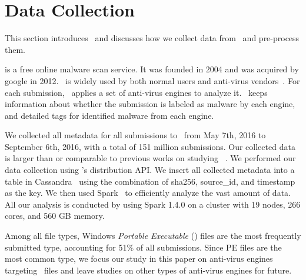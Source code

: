 \section{Data Collection}
\label{sec:meth}

This section introduces \vt\ and 
discusses how we collect data from \vt\ and pre-process them.

\noindent{\underline{\textit{\vt}}}
is a free online malware scan service.
It was founded in 2004 and was acquired by google in 2012. 
\vt\ is widely used by both normal users and anti-virus vendors~\cite{huangvt2016bigdata, neeles}. 
For each submission, \vt\ applies a set of anti-virus engines to analyze it. 
\vt\ keeps information about whether the submission is labeled as malware by each engine, 
and detailed tags for identified malware from each engine. 


We collected all metadata for all submissions to \vt\ from May 7th, 2016 to September 6th, 2016,
with a total of 151 million submissions. 
Our collected data is larger than or comparable to previous works on studying \vt~\cite{SongAPsys2016,huangvt2016bigdata}.
We performed our data collection using \vt{}'s distribution API.
We insert all collected metadata into a table in Cassandra~\cite{cassandra} 
using the combination of sha256, source\_id, and timestamp as the key.
We then used Spark~\cite{spark} to efficiently analyze the vast amount of data.
All our analysis is conducted by using Spark 1.4.0 on a cluster with 19 nodes, 266 cores, and 560 GB memory. 

Among all file types, Windows \textit{Portable Executable} ({\em \pe}) files 
are the most frequently submitted type,
accounting for 51\% of all submissions.
Since PE files are the most common type,
we focus our study in this paper on anti-virus engines targeting \pe\ files 
and leave studies on other types of anti-virus engines for future. 

